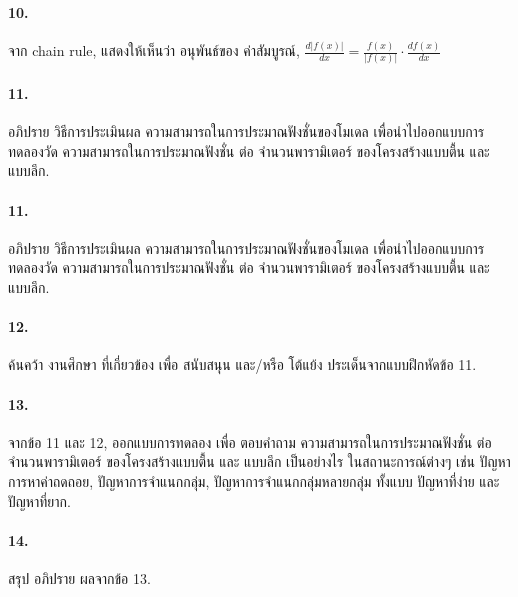 \paragraph{10.}
จาก chain rule, แสดงให้เห็นว่า อนุพันธ์ของ ค่าสัมบูรณ์, $\frac{d | f(x) |}{d x} = \frac{f(x)}{|f(x)|} \cdot \frac{d f(x)}{d x}$

\paragraph{11.}
อภิปราย วิธีการประเมินผล ความสามารถในการประมาณฟังชั่นของโมเดล เพื่อนำไปออกแบบการทดลองวัด ความสามารถในการประมาณฟังชั่น ต่อ จำนวนพารามิเตอร์ ของโครงสร้างแบบตื้น และ แบบลึก.

\paragraph{11.}
อภิปราย วิธีการประเมินผล ความสามารถในการประมาณฟังชั่นของโมเดล เพื่อนำไปออกแบบการทดลองวัด ความสามารถในการประมาณฟังชั่น ต่อ จำนวนพารามิเตอร์ ของโครงสร้างแบบตื้น และ แบบลึก.

\paragraph{12.} 
ค้นคว้า งานศึกษา ที่เกี่ยวข้อง เพื่อ สนับสนุน และ/หรือ โต้แย้ง ประเด็นจากแบบฝึกหัดข้อ 11.

\paragraph{13.} 
จากข้อ 11 และ 12, ออกแบบการทดลอง เพื่อ ตอบคำถาม ความสามารถในการประมาณฟังชั่น ต่อ จำนวนพารามิเตอร์ ของโครงสร้างแบบตื้น และ แบบลึก เป็นอย่างไร ในสถานะการณ์ต่างๆ เช่น ปัญหาการหาค่าถดถอย, ปัญหาการจำแนกกลุ่ม, ปัญหาการจำแนกกลุ่มหลายกลุ่ม ทั้งแบบ ปัญหาที่ง่าย และ ปัญหาที่ยาก.

\paragraph{14.} 
สรุป อภิปราย ผลจากข้อ 13.